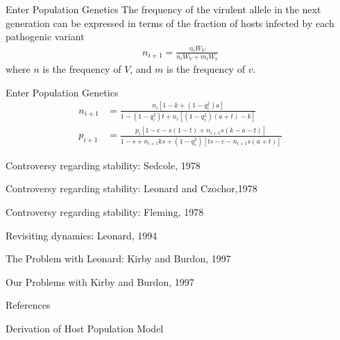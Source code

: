 \documentclass[presentation]{beamer}
\begin{document}
\begin{frame}{Enter Population Genetics}
The frequency of the virulent allele in the next generation can be expressed in terms of the fraction of hosts infected by each pathogenic variant
\begin{align*}
n_{i+1}=\frac{n_iW_V}{n_iW_V+m_iW_v}
\end{align*}
where $n$ is the frequency of $V$, and $m$ is the frequency of $v$.
\end{frame}
\begin{frame}[label=PathogenDerivation]{Enter Population Genetics}
\begin{align}
n_{i+1} &= \frac{n_i[1-k+(1-q_i^2)a]}{1-(1-q_i^2)t+n_i[(1-q_i^2)(a+t)-k]} \label{eq:Leonard94-1} \\
p_{i+1} &= \frac{p_i[1-c-s(1-t)+n_{i+1}s(k-a-t)]}{1-s+n_{i+1}ks+(1-q_i^2)[ts-c-n_{i+1}s(a+t)]} \label{eq:Leonard94-2}
\end{align}
\vfill{}
\hyperlink{HostDerivation}{}
\end{frame}
\begin{frame}[label=sec-3]{Controversy regarding stability: Sedcole, 1978}
\end{frame}
\begin{frame}[label=sec-4]{Controversy regarding stability: Leonard and Czochor,1978}
\end{frame}
\begin{frame}[label=sec-5]{Controversy regarding stability: Fleming, 1978}
\end{frame}
\begin{frame}[label=sec-6]{Revisiting dynamics: Leonard, 1994}
\end{frame}
\begin{frame}[label=sec-7]{The Problem with Leonard: Kirby and Burdon, 1997}
\end{frame}
\begin{frame}[label=sec-8]{Our Problems with Kirby and Burdon, 1997}
\end{frame}
\begin{frame}{References}


\end{frame}
\appendix
\begin{frame}[label=HostDerivation]{Derivation of Host Population Model}
\hyperlink{PathogenDerivation}{}
\end{frame}
\end{document}
